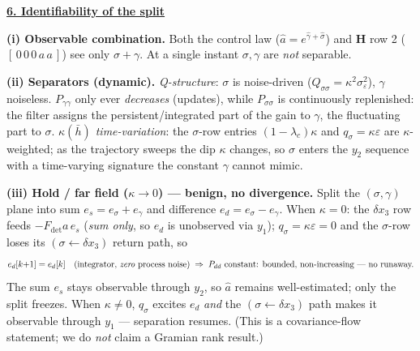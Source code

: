 \documentclass[11pt,a4paper,fontset=none]{ctexart}
\newcommand{\lc}{\lambda_c}
\newcommand{\hd}[1]{\par\medskip\noindent\underline{\textbf{#1}}\par\nobreak\vspace{0.2ex}}
\newcommand{\Fdet}{F_{\!\mathrm{det}}}
\begin{document}
\hd{6. Identifiability of the split}
\textbf{(i) Observable combination.} Both the control law ($\hat a=e^{\hat\gamma+\hat\sigma}$) and $\mathbf H$ row 2 ($[\,0\,0\,0\,a\,a\,]$) see only $\sigma+\gamma$. At a single instant $\sigma,\gamma$ are \emph{not} separable.

\textbf{(ii) Separators (dynamic).}
\emph{Q-structure}: $\sigma$ is noise-driven ($Q_{\sigma\sigma}=\kappa^2\sigma_\varepsilon^2$), $\gamma$ noiseless. $P_{\gamma\gamma}$ only ever \emph{decreases} (updates), while $P_{\sigma\sigma}$ is continuously replenished: the filter assigns the persistent/integrated part of the gain to $\gamma$, the fluctuating part to $\sigma$.
\emph{$\kappa(\bar h)$ time-variation}: the $\sigma$-row entries $(1-\lc)\kappa$ and $q_\sigma=\kappa\varepsilon$ are $\kappa$-weighted; as the trajectory sweeps the dip $\kappa$ changes, so $\sigma$ enters the $y_2$ sequence with a time-varying signature the constant $\gamma$ cannot mimic.

\textbf{(iii) Hold / far field ($\kappa\to0$) --- benign, no divergence.} Split the $(\sigma,\gamma)$ plane into sum $e_s=e_\sigma+e_\gamma$ and difference $e_d=e_\sigma-e_\gamma$. When $\kappa=0$: the $\delta x_3$ row feeds $-\Fdet a\,e_s$ (\emph{sum only}, so $e_d$ is unobserved via $y_1$); $q_\sigma=\kappa\varepsilon=0$ and the $\sigma$-row loses its $(\sigma\!\leftarrow\!\delta x_3)$ return path, so
\[ e_d[k{+}1]=e_d[k]\quad(\text{integrator, \emph{zero} process noise}) \;\Rightarrow\; P_{dd}\ \text{constant: bounded, non-increasing --- no runaway.} \]
The sum $e_s$ stays observable through $y_2$, so $\hat a$ remains well-estimated; only the split freezes. When $\kappa\!\ne\!0$, $q_\sigma$ excites $e_d$ \emph{and} the $(\sigma\!\leftarrow\!\delta x_3)$ path makes it observable through $y_1$ --- separation resumes. (This is a covariance-flow statement; we do \emph{not} claim a Gramian rank result.)
\end{document}
